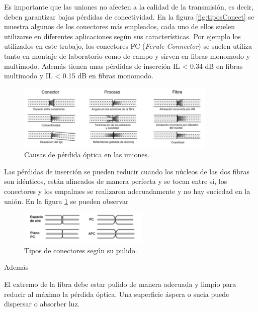 \begin{itemize}
\begin{itemize}
 		Es importante que las uniones no afecten a la calidad de la transmisión, es decir, deben garantizar bajas pérdidas de conectividad. En la figura \ref{fig:tiposConect} se muestra algunos de los conectores más empleados, cada uno de ellos suelen utilizarse en diferentes aplicaciones según sus características. Por ejemplo los utilizados en este trabajo, los conectores FC (\textit{Ferule Connector}) se suelen utiliza tanto en montaje de laboratorio como de campo y sirven en fibras monomodo y multimodo. Además tienen unas pérdidas de inserción IL < 0.34 dB en fibras multimodo y IL < 0.15 dB en fibras monomodo. \cite{TipConectoresFO}\\
 		\begin{figure}[H]
	 		\centering
	 		\includegraphics[width=0.85\textwidth]{./img/perdidasOpticas}
	 		\caption{Causas de pérdida óptica en las uniones. \cite{FOAconect}} 
	 		\label{fig:conectLoss}
 		\end{figure}
 		Las pérdidas de inserción se pueden reducir cuando los núcleos de las dos fibras son idénticos, están alineados de manera perfecta y se tocan entre sí, los conectores y los empalmes se realizaron adecuadamente y no hay suciedad en la unión. En la figura \ref{fig:conectLoss} se pueden observar 
 		
   		\begin{figure}[H]
   			\centering
   			\includegraphics[width=0.55\textwidth]{./img/conectoresPulido}
   			\caption{Tipos de conectores según su pulido. \cite{TipConectoresFO}} 
   			\label{fig:tiposPulidos}
   		\end{figure}


 Además 
 

 
 El extremo de la fibra debe estar pulido de manera adecuada y limpio para reducir al máximo la pérdida óptica. Una superficie áspera o sucia puede dispersar o absorber luz. 
 

\end{itemize}
\end{itemize}
